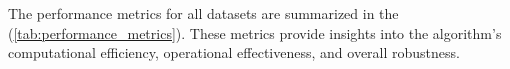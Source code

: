 




\vspace*{6mm}

The performance metrics for all datasets are summarized in the (\autoref{tab:performance_metrics}). These metrics provide insights into the algorithm's computational efficiency, operational effectiveness, and overall robustness.

